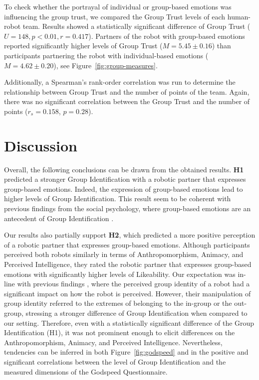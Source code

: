 To check whether the portrayal of individual or group-based emotions was influencing the group trust, we compared the Group Trust levels of each human-robot team. Results showed a statistically significant difference of Group Trust ($U=148, p<0.01, r=0.417$). Partners of the robot with group-based emotions reported significantly higher levels of Group Trust ($M=5.45\pm0.16$) than participants partnering the robot with individual-based emotions ($M=4.62\pm0.20$), see Figure~\ref{fig:group-measures}.

Additionally, a Spearman's rank-order correlation was run to determine the relationship between Group Trust and the number of points of the team. Again, there was no significant correlation between the Group Trust and the number of points ($r_s=0.158$, $p=0.28$).

\section{Discussion}
\label{sec:study4-discussion}
Overall, the following conclusions can be drawn from the obtained results. \textbf{H1} predicted a stronger Group Identification with a robotic partner that expresses group-based emotions. Indeed, the expression of group-based emotions lead to higher levels of Group Identification. This result seem to be coherent with previous findings from the social psychology, where group-based emotions are an antecedent of Group Identification \cite{kessler2005group}.

Our results also partially support \textbf{H2}, which predicted a more positive perception of a robotic partner that expresses group-based emotions. Although participants perceived both robots similarly in terms of Anthropomorphism, Animacy, and Perceived Intelligence, they rated the robotic partner that expresses group-based emotions with significantly higher levels of Likeability. Our expectation was in-line with previous findings \cite{kuchenbrandt2013robot,haring2014would}, where the perceived group identity of a robot had a significant impact on how the robot is perceived. However, their manipulation of group identity referred to the extremes of belonging to the in-group or the out-group, stressing a stronger difference of Group Identification when compared to our setting. Therefore, even with a statistically significant difference of the Group Identification (H1), it was not prominent enough to elicit differences on the Anthropomorphism, Animacy, and Perceived Intelligence. Nevertheless, tendencies can be inferred in both Figure~\ref{fig:godspeed} and in the positive and significant correlations between the level of Group Identification and the measured dimensions of the Godspeed Questionnaire.

